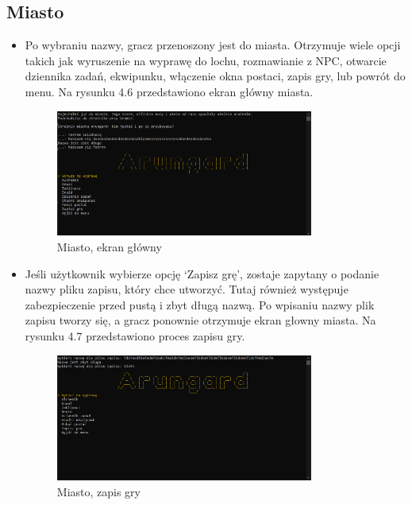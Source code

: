 \subsection{Miasto}
\begin{itemize}
        \item Po wybraniu nazwy, gracz przenoszony jest do miasta. Otrzymuje wiele opcji takich jak wyruszenie na wyprawę do lochu, 
        rozmawianie z NPC, otwarcie dziennika zadań, ekwipunku, włączenie okna postaci, zapis gry, lub powrót do menu. 
        Na rysunku 4.6 przedstawiono ekran główny miasta.
            \begin{figure}[H]
                \centering
                \includegraphics[width=0.8\textwidth]{figures/warstwa_uzytkowa/miasto_1.png}
                \caption{Miasto, ekran główny}
                \label{fig:city_1}
            \end{figure}
        \item Jeśli użytkownik wybierze opcję `Zapisz grę', zostaje zapytany o podanie nazwy pliku zapisu, który chce utworzyć. 
        Tutaj również występuje zabezpieczenie przed pustą i zbyt długą nazwą. Po wpisaniu nazwy plik zapisu tworzy się, a 
        gracz ponownie otrzymuje ekran głowny miasta. Na rysunku 4.7 przedstawiono proces zapisu gry.
            \begin{figure}[H]
                \centering
                \includegraphics[width=0.8\textwidth]{figures/warstwa_uzytkowa/miasto_2.png}
                \caption{Miasto, zapis gry}

\end{figure}
\end{itemize}
